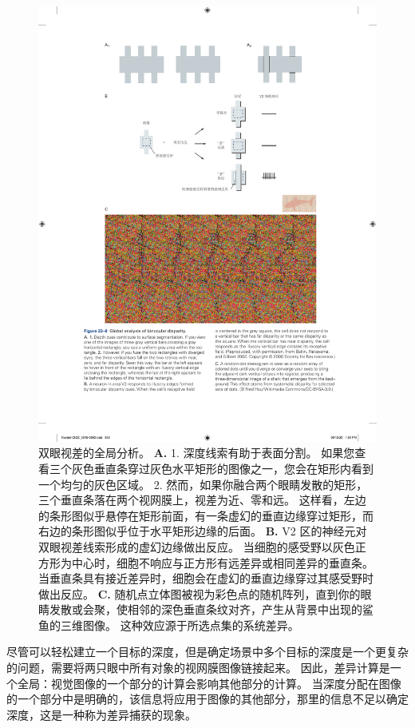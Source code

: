 \begin{figure}[htbp]
	\centering
	\includegraphics[width=0.95\linewidth]{chap23/fig_23_8}
	\caption{双眼视差的全局分析。
		\textbf{A.} 1. 深度线索有助于表面分割。
		如果您查看三个灰色垂直条穿过灰色水平矩形的图像之一，您会在矩形内看到一个均匀的灰色区域。
		2. 然而，如果你融合两个眼睛发散的矩形，三个垂直条落在两个视网膜上，视差为近、零和远。
		这样看，左边的条形图似乎悬停在矩形前面，有一条虚幻的垂直边缘穿过矩形，而右边的条形图似乎位于水平矩形边缘的后面。
		\textbf{B.} V2 区的神经元对双眼视差线索形成的虚幻边缘做出反应。
		当细胞的感受野以灰色正方形为中心时，细胞不响应与正方形有远差异或相同差异的垂直条。
		当垂直条具有接近差异时，细胞会在虚幻的垂直边缘穿过其感受野时做出反应\cite{bakin2000visual}。
		\textbf{C.} 随机点立体图被视为彩色点的随机阵列，直到你的眼睛发散或会聚，使相邻的深色垂直条纹对齐，产生从背景中出现的鲨鱼的三维图像。
		这种效应源于所选点集的系统差异。}
	\label{fig:23_8}
\end{figure}


尽管可以轻松建立一个目标的深度，但是确定场景中多个目标的深度是一个更复杂的问题，需要将两只眼中所有对象的视网膜图像链接起来。
因此，差异计算是一个全局：视觉图像的一个部分的计算会影响其他部分的计算。
当深度分配在图像的一个部分中是明确的，该信息将应用于图像的其他部分，那里的信息不足以确定深度，这是一种称为差异捕获的现象。


